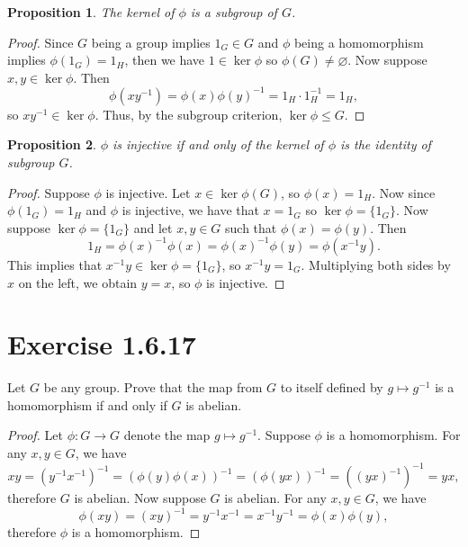 \documentclass[12pt]{article}
\newtheorem{proposition}{Proposition}
\newenvironment{problem}
    {\begin{lrbox}{\mybox}\begin{minipage}{\textwidth-10pt}}
    {\end{minipage}\end{lrbox}\framebox[6.5in]{\usebox{\mybox}}}
\let\emptyset\varnothing
\begin{document}
\begin{proposition}
    The kernel of $\phi$ is a subgroup of $G$.
\end{proposition}

\begin{proof}
    Since $G$ being a group implies $1_G\in G$ and $\phi$ being a homomorphism implies $\phi(1_G)=1_H$, then we have $1\in\ker\phi$ so $\phi(G)\ne\emptyset$. Now suppose $x,y\in\ker\phi$. Then
    \[\phi(xy^{-1}) = \phi(x)\phi(y)^{-1} = 1_H \cdot 1_H^{-1} = 1_H,\]
    so $xy^{-1}\in\ker\phi$. Thus, by the subgroup criterion, $\ker\phi\leq G$.
    
\end{proof}

\begin{proposition}
    $\phi$ is injective if and only of the kernel of $\phi$ is the identity of subgroup $G$.
\end{proposition}

\begin{proof}
    Suppose $\phi$ is injective. Let $x\in\ker\phi(G)$, so $\phi(x) = 1_H$. Now since $\phi(1_G)=1_H$ and $\phi$ is injective, we have that $x=1_G$ so $\ker\phi=\{1_G\}$. Now suppose $\ker\phi=\{1_G\}$ and let $x,y\in G$ such that $\phi(x)=\phi(y)$. Then
    \[1_H = \phi(x)^{-1}\phi(x) = \phi(x)^{-1}\phi(y) = \phi(x^{-1}y).\]
    This implies that $x^{-1}y\in\ker\phi=\{1_G\}$, so $x^{-1}y=1_G$. Multiplying both sides by $x$ on the left, we obtain $y=x$, so $\phi$ is injective.
    
\end{proof}

\section*{Exercise 1.6.17}
\begin{problem}
    Let $G$ be any group. Prove that the map from $G$ to itself defined by $g\mapsto g^{-1}$ is a homomorphism if and only if $G$ is abelian.
\end{problem}

\begin{proof}
    Let $\phi:G\to G$ denote the map $g\mapsto g^{-1}$. Suppose $\phi$ is a homomorphism. For any $x,y\in G$, we have
    \[xy = (y^{-1}x^{-1})^{-1} = (\phi(y)\phi(x))^{-1} = (\phi(yx))^{-1} = ((yx)^{-1})^{-1} = yx,\]
    therefore $G$ is abelian. Now suppose $G$ is abelian. For any $x,y\in G$, we have
    \[\phi(xy) = (xy)^{-1} = y^{-1}x^{-1} = x^{-1}y^{-1} = \phi(x)\phi(y),\]
    therefore $\phi$ is a homomorphism.
    
\end{proof}
\end{document}
